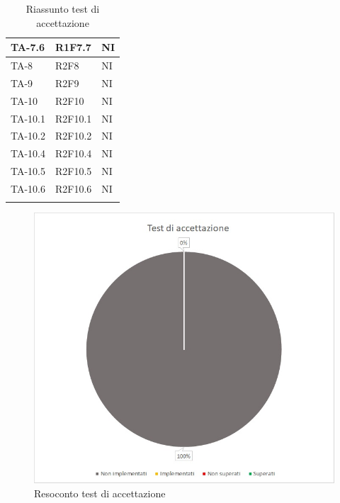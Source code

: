 \begin{longtable}{|C{2.5cm}|C{2.5cm}|C{2.5cm}|}
	\hline
	{TA-7.6} & {R1F7.7}
	& {NI}\\
	\hline
	{TA-8} & {R2F8}
	& {NI}\\
	\hline
	{TA-9} & {R2F9}
	& {NI}\\
	\hline
	{TA-10} & {R2F10}
	& {NI}\\
	\hline
	{TA-10.1} & {R2F10.1}
	& {NI}\\
	\hline
	{TA-10.2} & {R2F10.2}
	& {NI}\\
	\hline
	{TA-10.4} & {R2F10.4}
	& {NI}\\
	\hline
	{TA-10.5} & {R2F10.5}
	& {NI}\\
	\hline
	{TA-10.6} & {R2F10.6}
	& {NI}\\
	\hline
	\caption{Riassunto test di accettazione}
	\label{tabella:riassunto ta}
\end{longtable}
\normalsize
\renewcommand{\arraystretch}{1}
\begin{figure} [H]
	\centering
	\includegraphics[scale=1]{Img/TA}
	\caption{Resoconto test di accettazione}\label{}
\end{figure}
\newpage

